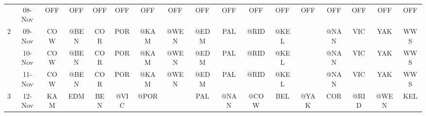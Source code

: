 \begin{table}[htbp]
\begin{tabular}{ccrrrrrrrrrrrrrrr}
          & 08-Nov & \multicolumn{1}{c}{OFF} & \multicolumn{1}{c}{OFF} & \multicolumn{1}{c}{OFF} & \multicolumn{1}{c}{OFF} & \multicolumn{1}{c}{OFF} & \multicolumn{1}{c}{OFF} & \multicolumn{1}{c}{OFF} & \multicolumn{1}{c}{OFF} & \multicolumn{1}{c}{OFF} & \multicolumn{1}{c}{OFF} & \multicolumn{1}{c}{OFF} & \multicolumn{1}{c}{OFF} & \multicolumn{1}{c}{OFF} & \multicolumn{1}{c}{OFF} & \multicolumn{1}{c}{OFF} \\
    2     & 09-Nov & \multicolumn{1}{c}{COW} & \multicolumn{1}{c}{@BEN} & \multicolumn{1}{c}{COR} & \multicolumn{1}{c}{POR} & \multicolumn{1}{c}{\cellcolor[rgb]{ .588,  .588,  .588}@KAM} & \multicolumn{1}{c}{\cellcolor[rgb]{ .588,  .588,  .588}@WEN} & \multicolumn{1}{c}{@EDM} & \multicolumn{1}{c}{PAL} & \multicolumn{1}{c}{\cellcolor[rgb]{ .588,  .588,  .588}@RID} & \multicolumn{1}{c}{\cellcolor[rgb]{ .588,  .588,  .588}@KEL} &       & \multicolumn{1}{c}{@NAN} & \multicolumn{1}{c}{VIC} & \multicolumn{1}{c}{YAK} & \multicolumn{1}{c}{WWS} \\
          & 10-Nov & \multicolumn{1}{c}{COW} & \multicolumn{1}{c}{@BEN} & \multicolumn{1}{c}{COR} & \multicolumn{1}{c}{POR} & \multicolumn{1}{c}{\cellcolor[rgb]{ .588,  .588,  .588}@KAM} & \multicolumn{1}{c}{\cellcolor[rgb]{ .588,  .588,  .588}@WEN} & \multicolumn{1}{c}{@EDM} & \multicolumn{1}{c}{PAL} & \multicolumn{1}{c}{\cellcolor[rgb]{ .588,  .588,  .588}@RID} & \multicolumn{1}{c}{\cellcolor[rgb]{ .588,  .588,  .588}@KEL} &       & \multicolumn{1}{c}{@NAN} & \multicolumn{1}{c}{VIC} & \multicolumn{1}{c}{YAK} & \multicolumn{1}{c}{WWS} \\
          & 11-Nov & \multicolumn{1}{c}{COW} & \multicolumn{1}{c}{@BEN} & \multicolumn{1}{c}{COR} & \multicolumn{1}{c}{POR} & \multicolumn{1}{c}{\cellcolor[rgb]{ .588,  .588,  .588}@KAM} & \multicolumn{1}{c}{\cellcolor[rgb]{ .588,  .588,  .588}@WEN} & \multicolumn{1}{c}{@EDM} & \multicolumn{1}{c}{PAL} & \multicolumn{1}{c}{\cellcolor[rgb]{ .588,  .588,  .588}@RID} & \multicolumn{1}{c}{\cellcolor[rgb]{ .588,  .588,  .588}@KEL} &       & \multicolumn{1}{c}{@NAN} & \multicolumn{1}{c}{VIC} & \multicolumn{1}{c}{YAK} & \multicolumn{1}{c}{WWS} \\
    3     & 12-Nov & \multicolumn{1}{c}{KAM} & \multicolumn{1}{c}{EDM} & \multicolumn{1}{c}{BEN} & \multicolumn{1}{c}{@VIC} & \multicolumn{1}{c}{\cellcolor[rgb]{ .588,  .588,  .588}@POR} &       & \multicolumn{1}{c}{PAL} & \multicolumn{1}{c}{@NAN} & \multicolumn{1}{c}{\cellcolor[rgb]{ .588,  .588,  .588}@COW} & \multicolumn{1}{c}{BEL} & \multicolumn{1}{c}{\cellcolor[rgb]{ .588,  .588,  .588}@YAK} & \multicolumn{1}{c}{COR} & \multicolumn{1}{c}{\cellcolor[rgb]{ .588,  .588,  .588}@RID} & \multicolumn{1}{c}{@WEN} & \multicolumn{1}{c}{KEL} \\

\end{tabular}
\end{table}

